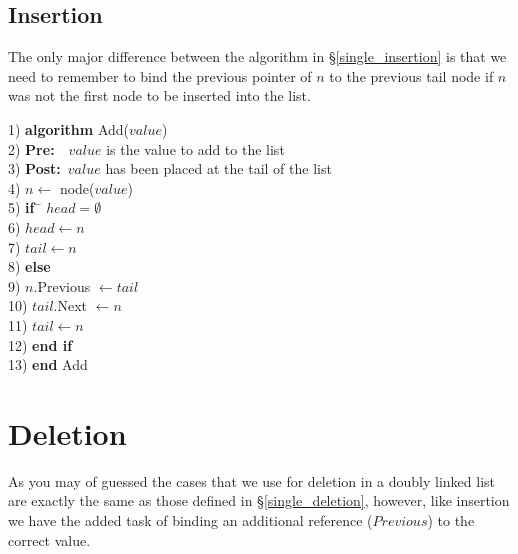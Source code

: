 \subsection{Insertion}
The only major difference between the algorithm in \S\ref{single_insertion} is that we need to remember to bind the previous pointer of $n$ to the previous tail node if $n$ was not the first node to be inserted into the list.

\begin{tabbing}
1)  \textbf{alg}\= \textbf{orithm} Add($value$) \\
2)  \> \textbf{Pre:}~~$value$ is the value to add to the list \\
3)  \> \textbf{Post:}~$value$ has been placed at the tail of the list \\
4)  \> $n \leftarrow$ node($value$) \\
5)  \> \textbf{if}~\= $head = \emptyset$ \\
6)  \> \> $head \leftarrow n$ \\
7)  \> \> $tail \leftarrow n$ \\
8)  \> \textbf{else} \\
9)  \> \> $n$.Previous $\leftarrow tail$ \\
10) \> \> $tail$.Next $\leftarrow n$ \\
11) \> \> $tail \leftarrow n$ \\
12) \> \textbf{end if} \\
13) \textbf{end} Add \\
\end{tabbing}

\section{Deletion}
As you may of guessed the cases that we use for deletion in a doubly linked list are exactly the same as those defined in \S\ref{single_deletion}, however, like insertion we have the added task of binding an additional reference ($Previous$) to the correct value.

